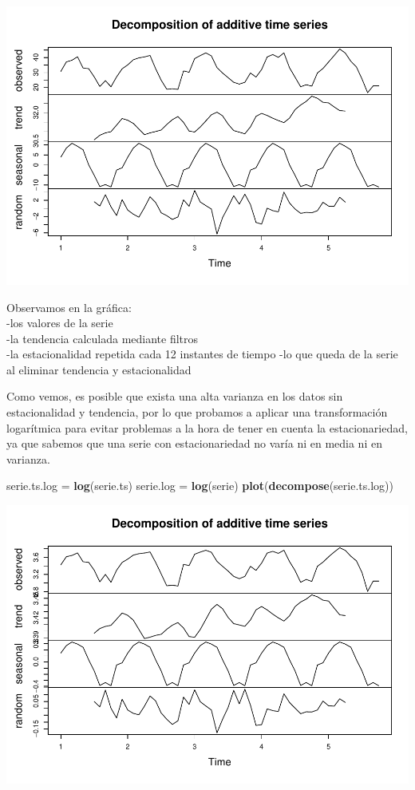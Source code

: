 \documentclass[]{article}
\newenvironment{Shaded}{\begin{snugshade}}{\end{snugshade}}
\newcommand{\KeywordTok}[1]{\textcolor[rgb]{0.13,0.29,0.53}{\textbf{#1}}}
\newcommand{\StringTok}[1]{\textcolor[rgb]{0.31,0.60,0.02}{#1}}
\newcommand{\NormalTok}[1]{#1}
\begin{document}
\includegraphics{timeSeries_files/figure-latex/unnamed-chunk-6-1.pdf}

Observamos en la gráfica:\\
-los valores de la serie\\
-la tendencia calculada mediante filtros\\
-la estacionalidad repetida cada 12 instantes de tiempo -lo que queda de
la serie al eliminar tendencia y estacionalidad

Como vemos, es posible que exista una alta varianza en los datos sin
estacionalidad y tendencia, por lo que probamos a aplicar una
transformación logarítmica para evitar problemas a la hora de tener en
cuenta la estacionariedad, ya que sabemos que una serie con
estacionariedad no varía ni en media ni en varianza.

\begin{Shaded}
\begin{Highlighting}[]
\NormalTok{serie.ts.log =}\StringTok{ }\KeywordTok{log}\NormalTok{(serie.ts)}
\NormalTok{serie.log =}\StringTok{ }\KeywordTok{log}\NormalTok{(serie)}
\KeywordTok{plot}\NormalTok{(}\KeywordTok{decompose}\NormalTok{(serie.ts.log))}
\end{Highlighting}
\end{Shaded}

\includegraphics{timeSeries_files/figure-latex/unnamed-chunk-7-1.pdf}
\end{document}

